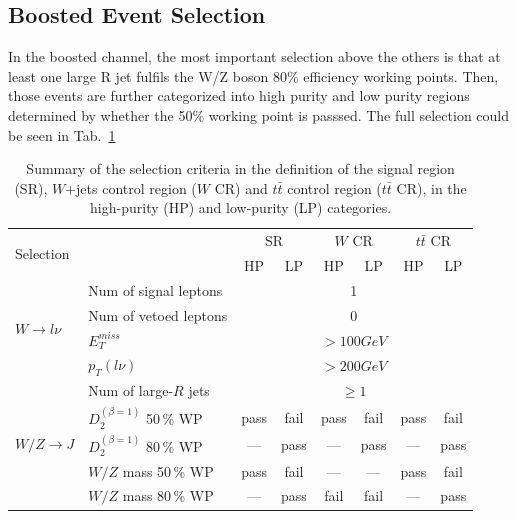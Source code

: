 \subsection{Boosted Event Selection}
In the boosted channel, the most important selection above the others is that at least one large R jet fulfils the W/Z boson $80\%$ efficiency working points. Then, those events are further categorized into high purity and low purity regions determined by whether the 50$\%$ working point is passsed. The full selection could be seen in Tab.~\ref{tab:SRdefinitions}

\begin{table}[t]
	\caption{Summary of the selection criteria in the definition of the signal region (SR), $W$+jets control region ($W$ CR) and $t\bar{t}$ control region ($t\bar{t}$ CR), in the high-purity (HP) and low-purity (LP) categories.  } \label{tab:SRdefinitions}
	\begin{center}
		\begin{adjustbox}{center}
		\begin{tabular}{|l|l|c|c|c|c|c|c|}
			\hline
			\multicolumn{2}{|l|}{\multirow{2}{*}{Selection}} & \multicolumn{2}{c|}{SR}  &  \multicolumn{2}{c|}{$W$ CR}  & \multicolumn{2}{c|}{$t\bar{t}$ CR} \\
			\cline{3-8}
			\multicolumn{2}{|l|}{} & HP & LP &HP & LP & HP & LP \\
			\hline
			\multirow{4}{*}{$W\rightarrow l\nu$} & Num of signal leptons & \multicolumn{6}{c|}{ 1 } \\
			\cline{2-8}
			&Num of vetoed leptons & \multicolumn{6}{c|}{ 0 }  \\
			\cline{2-8}
			&\vphantom{\Large B} $E^{miss}_{T}$ & \multicolumn{6}{c|}{ $>100GeV$ } \\
			\cline{2-8}
			&$p_{T}(l\nu)$ & \multicolumn{6}{c|}{ $>200GeV$ } \\
			\hline
			\multirow{5}{*}{$W/Z\rightarrow J$} & Num of large-$R$ jets & \multicolumn{6}{c|}{ $\geq 1$ } \\
			\cline{2-8}
			& \vphantom{\Large B} $D^{(\beta=1)}_2$ 50\,\% WP & pass & fail & pass & fail & pass & fail \\
			\cline{2-8}
			& \vphantom{\Large B} $D^{(\beta=1)}_2$ 80\,\% WP & --- & pass  & --- & pass  & --- & pass \\
			\cline{2-8}
			& $W/Z$ mass 50\,\% WP & pass &fail& --- & --- & pass & fail\\
			\cline{2-8}
			& $W/Z$ mass 80\,\% WP &  --- & pass & fail & fail & --- & pass\\

\end{tabular}
\end{adjustbox}
\end{center}
\end{table}
